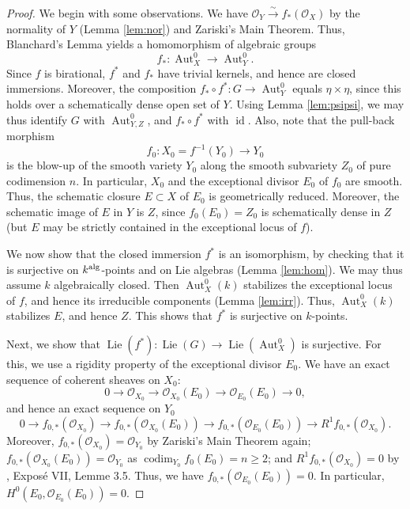 \documentclass[oneside, 12pt]{amsart}
\theoremstyle{definition}
\theoremstyle{remark}
\newcommand{\catO}{\mathcal{O}}
\newcommand{\alg}{\text{\rm alg}}
\newcommand{\Aut}{\operatorname{Aut}}
\newcommand{\codim}{\operatorname{codim}}
\newcommand{\id}{{\operatorname{id}}}
\newcommand{\Lie}{\operatorname{Lie}}
\begin{document}
\begin{proof}
We begin with some observations. We have
$\catO_Y \stackrel{\sim}{\longrightarrow}
f_*(\catO_X)$ by the normality of $Y$ (Lemma 
\ref{lem:nor}) and Zariski's Main Theorem. 
Thus, Blanchard's Lemma 
yields a homomorphism of algebraic groups 
\[ f_* : \Aut^0_X \longrightarrow \Aut^0_Y. \]
Since $f$ is birational, $f^*$ and $f_*$
have trivial kernels, and hence are closed
immersions. Moreover, the composition
$f_* \circ f^* : G \to \Aut^0_Y$
equals $\eta \times \eta$, since this holds
over a schematically dense open set of $Y$. 
Using Lemma \ref{lem:psipsi}, 
we may thus identify $G$ with $\Aut^0_{Y,Z}$, 
and $f_* \circ f^*$ with $\id$.
Also, note that the pull-back morphism
\[ f_0 : X_0 = f^{-1}(Y_0) \longrightarrow Y_0 \] 
is the blow-up of the smooth variety $Y_0$
along the smooth subvariety $Z_0$ of pure
codimension $n$. In particular, $X_0$
and the exceptional divisor $E_0$ of $f_0$
are smooth. Thus, the schematic closure 
$E \subset X$ of $E_0$ is geometrically reduced. 
Moreover, the schematic image of $E$ in $Y$ is $Z$, 
since $f_0(E_0) = Z_0$ is schematically dense in $Z$ 
(but $E$ may be strictly contained in the exceptional 
locus of $f$).

We now show that the closed immersion $f^*$ 
is an isomorphism, by checking that it is 
surjective on $k^{\alg}$-points and on Lie
algebras (Lemma \ref{lem:hom}). We may thus
assume $k$ algebraically closed. Then 
$\Aut^0_X(k)$ stabilizes the exceptional locus 
of $f$, and hence its irreducible components 
(Lemma \ref{lem:irr}). Thus, $\Aut^0_X(k)$
stabilizes $E$, and hence $Z$. This shows 
that $f^*$ is surjective on $k$-points.

Next, we show that
$\Lie(f^*) : \Lie(G) \to \Lie(\Aut^0_X)$
is surjective. For this, we use a rigidity
property of the exceptional divisor $E_0$.
We have an exact sequence of coherent sheaves
on $X_0$:
\[ 0 \longrightarrow \catO_{X_0}
\longrightarrow \catO_{X_0}(E_0)
\longrightarrow \catO_{E_0}(E_0)
\longrightarrow 0, \]
and hence an exact sequence on $Y_0$
\[ 0 \longrightarrow f_{0,*}(\catO_{X_0})
\longrightarrow f_{0,*}(\catO_{X_0}(E_0))
\longrightarrow f_{0,*}(\catO_{E_0}(E_0))
\longrightarrow R^1f_{0,*}(\catO_{X_0}). 
\]
Moreover, 
$f_{0,*}(\catO_{X_0}) = \catO_{Y_0}$
by Zariski's Main Theorem again; 
$f_{0,*}(\catO_{X_0}(E_0)) = \catO_{Y_0}$
as $\codim_{Y_0} f_0(E_0) = n \geq 2$;
and $R^1f_{0,*}(\catO_{X_0}) = 0$
by \cite{SGA 6}, Expos\'e VII, Lemme 3.5. 
Thus, we have
$f_{0,*}(\catO_{E_0}(E_0)) = 0$. In particular,
$H^0(E_0, \catO_{E_0}(E_0)) = 0$.


\end{proof}
\end{document}
